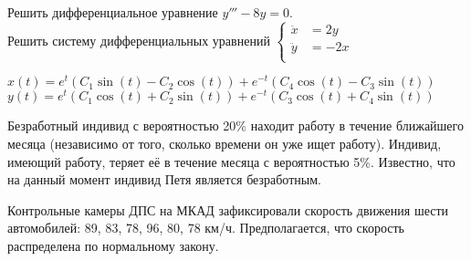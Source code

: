 \documentclass[addpoints, answers]{exam} %
\begin{document}
\begin{questions}
\question Решить дифференциальное уравнение $y'''-8y=0$.\\

\question Решить систему дифференциальных уравнений 
$\left\{ \begin{aligned}
\ddot{x}&=2y\\
\ddot{y}&=-2x\\
\end{aligned} \right.$\\

\begin{solution}
 $x(t)=e^{t}(C_{1}\sin(t)-C_{2}\cos(t))+e^{-t}(C_{4}\cos(t)-C_{3}\sin(t))$\\
$y(t)=e^{t}(C_{1}\cos(t)+C_{2}\sin(t))+e^{-t}(C_{3}\cos(t)+C_{4}\sin(t))$
\end{solution}

\question Безработный индивид с вероятностью 20\% находит работу в течение ближайшего месяца (независимо от того, сколько времени он уже ищет работу). Индивид, имеющий работу, теряет её в течение месяца с вероятностью 5\%. Известно, что на данный момент индивид Петя является безработным.
\question Контрольные камеры ДПС на МКАД зафиксировали скорость движения шести автомобилей: 89, 83, 78, 96, 80, 78 км/ч. Предполагается, что скорость распределена по нормальному закону.
\end{questions}
\end{document}
